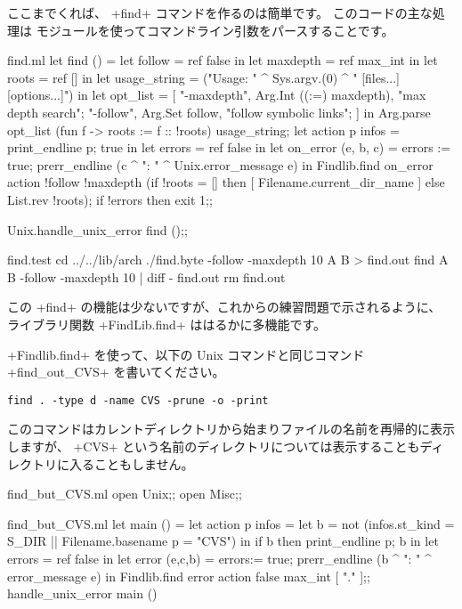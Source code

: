 ここまでくれば、 \ml+find+ コマンドを作るのは簡単です。
このコードの主な処理は  モジュールを使ってコマンドライン引数をパースすることです。
\begin{listingcodefile}{find.ml}
let find () =
  let follow = ref false in
  let maxdepth = ref max_int in
  let roots = ref [] in
  let usage_string  =
    ("Usage: " ^ Sys.argv.(0) ^ " [files...] [options...]") in
  let opt_list =  [
    "-maxdepth", Arg.Int ((:=) maxdepth), "max depth search";
    "-follow", Arg.Set follow, "follow symbolic links";
  ] in
  Arg.parse opt_list (fun f -> roots := f :: !roots) usage_string;
  let action p infos = print_endline p; true in
  let errors = ref false in
  let on_error (e, b, c) =
    errors := true; prerr_endline (c ^ ": " ^ Unix.error_message e) in
  Findlib.find on_error action !follow !maxdepth
    (if !roots = [] then [ Filename.current_dir_name ]
     else List.rev !roots);
  if !errors then exit 1;;

Unix.handle_unix_error find ();;
\end{listingcodefile}
%
\begin{codefile}{find.test}
cd ../../lib/arch
./find.byte -follow -maxdepth 10 A B > find.out
find A B -follow -maxdepth 10 | diff - find.out
rm find.out
\end{codefile}
この \ml+find+ の機能は少ないですが、これからの練習問題で示されるように、
ライブラリ関数 \ml+FindLib.find+ ははるかに多機能です。

\begin{exercise}
\ml+Findlib.find+ を使って、以下の Unix コマンドと同じコマンド \ml+find_out_CVS+ を書いてください。
\begin{lstlisting}
find . -type d -name CVS -prune -o -print
\end{lstlisting}
このコマンドはカレントディレクトリから始まりファイルの名前を再帰的に表示しますが、
\ml+CVS+ という名前のディレクトリについては表示することもディレクトリに入ることもしません。
\end{exercise}
\begin{answer}
\begin{codefile}{find_but_CVS.ml}
open Unix;;
open Misc;;
\end{codefile}
%
\begin{listingcodefile}{find_but_CVS.ml}
let main () =
  let action p infos =
    let b = not (infos.st_kind = S_DIR || Filename.basename p = "CVS") in
    if b then print_endline p; b in
  let errors = ref false in
  let error (e,c,b) =
    errors:= true; prerr_endline (b ^ ": " ^ error_message e) in
  Findlib.find error action false max_int [ "." ];;
handle_unix_error main ()
\end{listingcodefile}
\end{answer}

